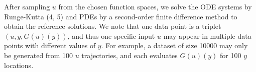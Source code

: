 \documentclass[11pt]{article}
\begin{document}
After sampling $u$ from the chosen function spaces, we solve the ODE systems by  Runge-Kutta (4, 5) and PDEs by a second-order finite difference method to obtain the reference solutions. We note that one data point is a triplet $(u, y, G(u)(y))$, and thus one specific input $u$ may appear in multiple data points with different values of $y$. For example, a dataset of size 10000 may only be generated from 100 $u$ trajectories, and each evaluates $G(u)(y)$ for 100 $y$ locations.





\end{document}
